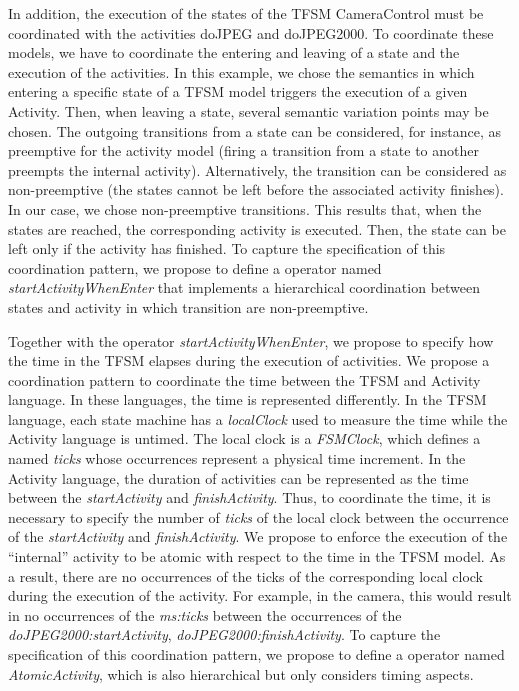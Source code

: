 In addition, the execution of the states of the TFSM CameraControl must be coordinated with the activities doJPEG and doJPEG2000. To coordinate these models, we have to coordinate the entering and leaving of a state and the execution of the activities. In this example, we chose the semantics in which entering a specific state of a TFSM model triggers the execution of a given Activity. Then, when leaving a state, several semantic variation points may be chosen. The outgoing transitions from a state can be considered, for instance, as preemptive for the activity model (\ie firing a transition from a state to another preempts the internal activity). Alternatively, the transition can be considered as non-preemptive (\ie the states cannot be left before the associated activity finishes). In our case, we chose non-preemptive transitions. This results that, when the states are reached, the corresponding activity is executed. Then, the state can be left only if the activity has finished. To capture the specification of this coordination pattern, we propose to define a \bcool operator named \emph{startActivityWhenEnter} that implements a hierarchical coordination between states and activity in which transition are non-preemptive.     

Together with the operator \emph{startActivityWhenEnter}, we propose to specify how the time in the TFSM elapses during the execution of activities. We propose a coordination pattern to coordinate the time between the TFSM and Activity language. In these languages, the time is represented differently. In the TFSM language, each state machine has a \emph{localClock} used to measure the time while the Activity language is untimed. The local clock is a \emph{FSMClock}, which defines a \dse named \emph{ticks} whose occurrences represent a physical time increment. In the Activity language, the duration of activities can be represented as the time between the \dse \emph{startActivity} and \dse \emph{finishActivity}. Thus, to coordinate the time, it is necessary to specify the number of \emph{ticks} of the local clock between the occurrence of the \dse \emph{startActivity} and \emph{finishActivity}. We propose to enforce the execution of the ``internal'' activity to be atomic with respect to the time in the TFSM model. As a result, there are no occurrences of the \dse ticks of the corresponding local clock during the execution of the activity. For example, in the camera, this would result in no occurrences of the \mse \emph{ms:ticks} between the occurrences of the \mse \emph{doJPEG2000:startActivity}, \emph{doJPEG2000:finishActivity}. To capture the specification of this coordination pattern, we propose to define a \bcool operator named \emph{AtomicActivity}, which is also hierarchical but only considers timing aspects.   


